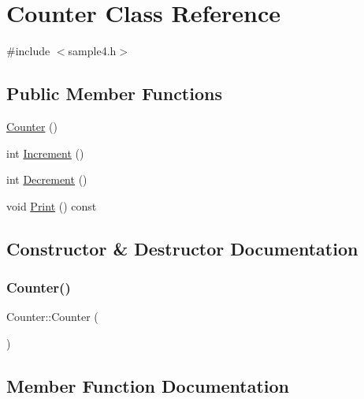 \hypertarget{classCounter}{}\section{Counter Class Reference}
\label{classCounter}


{\ttfamily \#include $<$sample4.\+h$>$}

\subsection*{Public Member Functions}
\begin{DoxyCompactItemize}
\item 
\mbox{\hyperlink{classCounter_a1e05f69b5240fbab3e7ab351672167f0}{Counter}} ()
\item 
int \mbox{\hyperlink{classCounter_a0a0ca9fdb580a2aec9a5a62ebed2b5ab}{Increment}} ()
\item 
int \mbox{\hyperlink{classCounter_aa58d9b4f0bd96fc2331234493eb21bed}{Decrement}} ()
\item 
void \mbox{\hyperlink{classCounter_a80092ec2a0deea0870b2e9f8ad0906bd}{Print}} () const
\end{DoxyCompactItemize}


\subsection{Constructor \& Destructor Documentation}
\mbox{\label{classCounter_a1e05f69b5240fbab3e7ab351672167f0}} 
\subsubsection{\texorpdfstring{Counter()}{Counter()}}
{\footnotesize\ttfamily Counter\+::\+Counter (\begin{DoxyParamCaption}{ }\end{DoxyParamCaption})\hspace{0.3cm}{\ttfamily [inline]}}



\subsection{Member Function Documentation}
\mbox{\label{classCounter_aa58d9b4f0bd96fc2331234493eb21bed}} 
